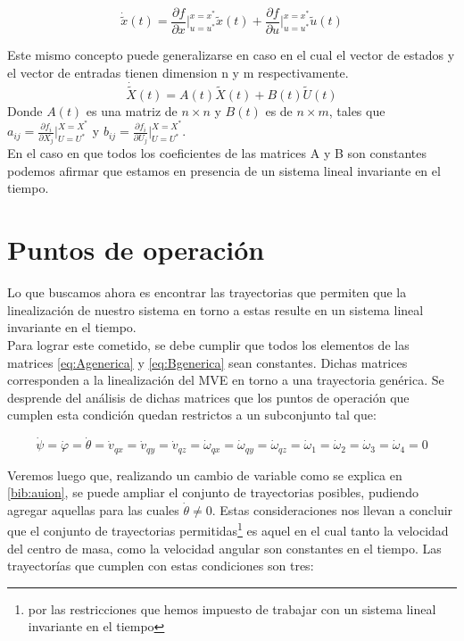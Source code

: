 \documentclass[main]{subfiles}
\begin{document}
\begin{equation}
\dot{\tilde{x}}(t)=\frac{\partial f}{\partial x}\vert_{u=u^*}^{x=x^*}\tilde{x}(t)+\frac{\partial f}{\partial u}\vert_{u=u^*}^{x=x^*}\tilde{u}(t)
\end{equation}

Este mismo concepto puede generalizarse en caso en el cual el vector de estados y el vector de entradas tienen dimension n y m respectivamente.
\begin{equation}
\dot{\tilde{X}}(t)=A(t)\tilde{X}(t)+B(t)\tilde{U}(t)
\end{equation}
Donde $A(t)$ es una matriz de $n \times n$ y $B(t)$ es de $n \times m$, tales que $a_{ij}= \frac{\partial f_i}{\partial X_j}\vert_{U=U^*}^{X=X^*}$ y  $b_{ij}= \frac{\partial f_i}{\partial U_j}\vert_{U=U^*}^{X=X^*}$.\\

En el caso en que todos los coeficientes de las matrices A y B son constantes podemos afirmar que estamos en presencia de un sistema lineal invariante en el tiempo. 

\section{Puntos de operaci\'on}
Lo que buscamos ahora es encontrar las trayectorias que permiten que la linealizaci\'on de nuestro sistema en torno a estas resulte en un sistema lineal invariante en el tiempo.\\

Para lograr este cometido, se debe cumplir que todos los elementos de las matrices \ref{eq:Agenerica} y \ref{eq:Bgenerica} sean constantes. Dichas matrices corresponden a la linealizaci\'on del MVE en torno a una trayectoria gen\'erica. Se desprende del an\'alisis de dichas matrices que los puntos de operaci\'on que cumplen esta condici\'on quedan restrictos a un subconjunto tal que: 

\begin{equation}
\dot{\psi}=\dot{\varphi}=\dot{\theta}=\dot{v}_{qx}=\dot{v}_{qy}=\dot{v}_{qz}=\dot{\omega}_{qx}=\dot{\omega}_{qy}=\dot{\omega}_{qz}=\dot{\omega}_1=\dot{\omega}_2=\dot{\omega}_3=\dot{\omega}_4=0
\end{equation}

Veremos luego que, realizando un cambio de variable como se explica en \ref{bib:auion}, se puede ampliar el conjunto de trayectorias posibles, pudiendo agregar aquellas para las cuales $\dot{\theta} \neq 0$. Estas consideraciones nos llevan a concluir que el conjunto de trayectorias permitidas\footnote{por las restricciones que hemos impuesto de trabajar con un sistema lineal invariante en el tiempo} es aquel en el cual tanto la velocidad del centro de masa, como la velocidad angular son constantes en el tiempo. Las trayector\'ias que cumplen con estas condiciones son tres:
\end{document}
